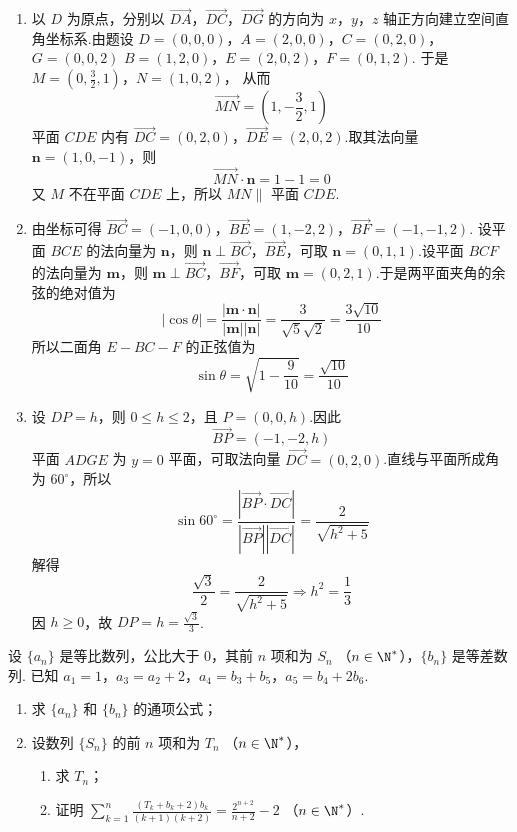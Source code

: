 \begin{solution}
\begin{enumerate}
\item 以 \(D\) 为原点，分别以 \(\overrightarrow{DA}\)，\(\overrightarrow{DC}\)，\(\overrightarrow{DG}\) 的方向为 \(x\)，\(y\)，\(z\) 轴正方向建立空间直角坐标系.由题设
\(D=(0,0,0)\)，\(A=(2,0,0)\)，\(C=(0,2,0)\)，\(G=(0,0,2)\)
\(B=(1,2,0)\)，\(E=(2,0,2)\)，\(F=(0,1,2)\).
于是
\(M=\left(0,\frac32,1\right)\)，\(N=(1,0,2)\)，
从而
\[
\overrightarrow{MN}=\left(1,-\frac32,1\right)
\]
平面 \(CDE\) 内有 \(\overrightarrow{DC}=(0,2,0)\)，\(\overrightarrow{DE}=(2,0,2)\).取其法向量 \(\mathbf{n}=(1,0,-1)\)，则
\[
\overrightarrow{MN}\cdot\mathbf{n}=1-1=0
\]
又 \(M\) 不在平面 \(CDE\) 上，所以 \(MN\parallel\) 平面 \(CDE\).

\item 由坐标可得
\(\overrightarrow{BC}=(-1,0,0)\)，\(\overrightarrow{BE}=(1,-2,2)\)，\(\overrightarrow{BF}=(-1,-1,2)\).
设平面 \(BCE\) 的法向量为 \(\mathbf{n}\)，则 \(\mathbf{n}\perp\overrightarrow{BC}\)，\(\overrightarrow{BE}\)，可取 \(\mathbf{n}=(0,1,1)\).设平面 \(BCF\) 的法向量为 \(\mathbf{m}\)，则 \(\mathbf{m}\perp\overrightarrow{BC}\)，\(\overrightarrow{BF}\)，可取 \(\mathbf{m}=(0,2,1)\).于是两平面夹角的余弦的绝对值为
\[
\left|\cos\theta\right|
=\frac{|\mathbf{m}\cdot\mathbf{n}|}{|\mathbf{m}||\mathbf{n}|}
=\frac{3}{\sqrt5\sqrt2}
=\frac{3\sqrt{10}}{10}
\]
所以二面角 \(E-BC-F\) 的正弦值为
\[
\sin\theta=\sqrt{1-\frac9{10}}=\frac{\sqrt{10}}{10}
\]

\item 设 \(DP=h\)，则 \(0\le h\le2\)，且 \(P=(0,0,h)\).因此
\[
\overrightarrow{BP}=(-1,-2,h)
\]
平面 \(ADGE\) 为 \(y=0\) 平面，可取法向量 \(\overrightarrow{DC}=(0,2,0)\).直线与平面所成角为 \(60^\circ\)，所以
\[
\sin60^\circ
=\frac{|\overrightarrow{BP}\cdot\overrightarrow{DC}|}
{|\overrightarrow{BP}||\overrightarrow{DC}|}
=\frac2{\sqrt{h^2+5}}
\]
解得
\[
\frac{\sqrt3}{2}=\frac2{\sqrt{h^2+5}}
\Longrightarrow h^2=\frac13
\]
因 \(h\ge0\)，故 \(DP=h=\frac{\sqrt3}{3}\).
\end{enumerate}
\end{solution}

\begin{problem}

设 \(\{a_n\}\) 是等比数列，公比大于 \(0\)，其前 \(n\) 项和为 \(S_n\) （\(n\in\N^*\)），\(\{b_n\}\) 是等差数列. 已知 \(a_1=1\)，\(a_3=a_2+2\)，\(a_4=b_3+b_5\)，\(a_5=b_4+2b_6\).

\begin{enumerate}
\item 求 \(\{a_n\}\) 和 \(\{b_n\}\) 的通项公式；
\item 设数列 \(\{S_n\}\) 的前 \(n\) 项和为 \(T_n\) （\(n\in\N^*\)），
\begin{enumerate}
\item 求 \(T_n\)；
\item 证明 \(\displaystyle \sum_{k=1}^n \frac{(T_k+b_k+2)b_k}{(k+1)(k+2)}=\frac{2^{n+2}}{n+2}-2\) （\(n\in\N^*\)）.
\end{enumerate}
\end{enumerate}
\end{problem}

